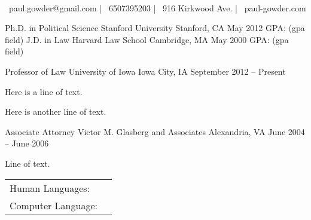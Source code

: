 \documentclass[]{awesome-cv}
\begin{document}
\begin{center}
	  \\
	\vspace{2mm}
	{\faEnvelope\ paul.gowder@gmail.com} | {\faMobile\ 6507395203} | {\faMapMarker\ 916 Kirkwood Ave.} | {\faLink\ paul-gowder.com}
\end{center}
\begin{cventries}
	\cventry
	{Ph.D. in Political Science}
	{Stanford University}
	{Stanford, CA}
	{May 2012}
	{GPA: (gpa field)}
	\cventry
	{J.D. in Law}
	{Harvard Law School}
	{Cambridge, MA}
	{May 2000}
	{GPA: (gpa field)}
\end{cventries}

\vspace{-2mm}
\begin{cventries}
	\cventry
	{Professor of Law}
	{University of Iowa}
	{Iowa City, IA}
	{September 2012 – Present}
	{\begin{cvitems}
		\item {Here is a line of text.}
		\item {Here is another line of text.}
		\end{cvitems}}
	\cventry
	{Associate Attorney}
	{Victor M. Glasberg and Associates}
	{Alexandria, VA}
	{June 2004 – June 2006}
	{\begin{cvitems}
		\item {Line of text.}
		\end{cvitems}}
\end{cventries}
\begin{cventries}
	\cventry
	{}
	{\def\arraystretch{1.15}{\begin{tabular}{ l l }
		Human Languages:  & {\skill{ English (native), Attic Greek (rudimentary reading)}} \\
		Computer Language:  & {\skill{ Clojure, Python, R, Javascript}} \\
		\end{tabular}}}
	{}
	{}
	{}
\end{cventries}
\end{document}
